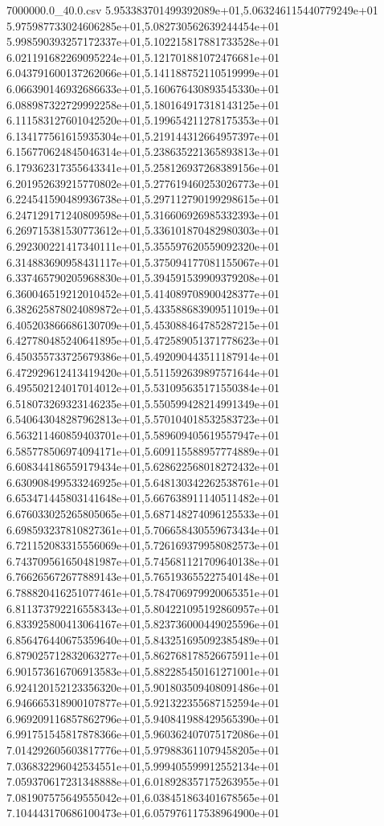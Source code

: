 \begin{filecontents*}{7000000.0_40.0.csv}
5.953383701499392089e+01,5.063246115440779249e+01
5.975987733024606285e+01,5.082730562639244454e+01
5.998590393257172337e+01,5.102215817881733528e+01
6.021191682269095224e+01,5.121701881072476681e+01
6.043791600137262066e+01,5.141188752110519999e+01
6.066390146932686633e+01,5.160676430893545330e+01
6.088987322729992258e+01,5.180164917318143125e+01
6.111583127601042520e+01,5.199654211278175353e+01
6.134177561615935304e+01,5.219144312664957397e+01
6.156770624845046314e+01,5.238635221365893813e+01
6.179362317355643341e+01,5.258126937268389156e+01
6.201952639215770802e+01,5.277619460253026773e+01
6.224541590489936738e+01,5.297112790199298615e+01
6.247129171240809598e+01,5.316606926985332393e+01
6.269715381530773612e+01,5.336101870482980303e+01
6.292300221417340111e+01,5.355597620559092320e+01
6.314883690958431117e+01,5.375094177081155067e+01
6.337465790205968830e+01,5.394591539909379208e+01
6.360046519212010452e+01,5.414089708900428377e+01
6.382625878024089872e+01,5.433588683909511019e+01
6.405203866686130709e+01,5.453088464785287215e+01
6.427780485240641895e+01,5.472589051371778623e+01
6.450355733725679386e+01,5.492090443511187914e+01
6.472929612413419420e+01,5.511592639897571644e+01
6.495502124017014012e+01,5.531095635171550384e+01
6.518073269323146235e+01,5.550599428214991349e+01
6.540643048287962813e+01,5.570104018532583723e+01
6.563211460859403701e+01,5.589609405619557947e+01
6.585778506974094171e+01,5.609115588957774889e+01
6.608344186559179434e+01,5.628622568018272432e+01
6.630908499533246925e+01,5.648130342262538761e+01
6.653471445803141648e+01,5.667638911140511482e+01
6.676033025265805065e+01,5.687148274096125533e+01
6.698593237810827361e+01,5.706658430559673434e+01
6.721152083315556069e+01,5.726169379958082573e+01
6.743709561650481987e+01,5.745681121709640138e+01
6.766265672677889143e+01,5.765193655227540148e+01
6.788820416251077461e+01,5.784706979920065351e+01
6.811373792216558343e+01,5.804221095192860957e+01
6.833925800413064167e+01,5.823736000449025596e+01
6.856476440675359640e+01,5.843251695092385489e+01
6.879025712832063277e+01,5.862768178526675911e+01
6.901573616706913583e+01,5.882285450161271001e+01
6.924120152123356320e+01,5.901803509408091486e+01
6.946665318900107877e+01,5.921322355687152594e+01
6.969209116857862796e+01,5.940841988429565390e+01
6.991751545817878366e+01,5.960362407075172086e+01
7.014292605603817776e+01,5.979883611079458205e+01
7.036832296042534551e+01,5.999405599912552134e+01
7.059370617231348888e+01,6.018928357175263955e+01
7.081907575649555042e+01,6.038451863401678565e+01
7.104443170686100473e+01,6.057976117538964900e+01

\end{filecontents*}
